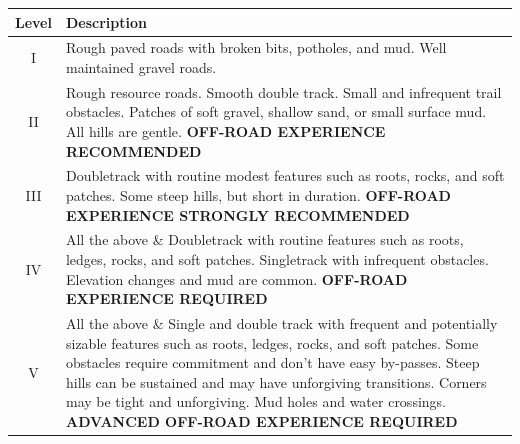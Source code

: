 \documentclass{article}
\begin{document}
\begin{minipage}[t]{0.9\linewidth}
    \begin{center}
        \begin{tabular}{|c|p{12cm}|}
            \hline
            \textbf{Level} & \textbf{Description}                                                                                                                                                                                                                                                                                                                                                                            \\
            \hline
            I              & Rough paved roads with broken bits, potholes, and mud. Well maintained gravel roads.                                                                                                                                                                                                                                                                                                            \\
            \hline
            II             & Rough resource roads. Smooth double track. Small and infrequent trail obstacles. Patches of soft gravel, shallow sand, or small surface mud. All hills are gentle. \textbf{OFF-ROAD EXPERIENCE RECOMMENDED}                                                                                                                                                                                     \\
            \hline
            III            & Doubletrack with routine modest features such as roots, rocks, and soft patches. Some steep hills, but short in duration. \textbf{OFF-ROAD EXPERIENCE STRONGLY RECOMMENDED}                                                                                                                                                                                                                     \\
            \hline
            IV             & All the above \& Doubletrack with routine features such as roots, ledges, rocks, and soft patches. Singletrack with infrequent obstacles. Elevation changes and mud are common. \textbf{OFF-ROAD EXPERIENCE REQUIRED}                                                                                                                                                                           \\
            \hline
            V              & All the above \& Single and double track with frequent and potentially sizable features such as roots, ledges, rocks, and soft patches. Some obstacles require commitment and don't have easy by-passes. Steep hills can be sustained and may have unforgiving transitions. Corners may be tight and unforgiving. Mud holes and water crossings. \textbf{ADVANCED OFF-ROAD EXPERIENCE REQUIRED} \\

\end{tabular}
\end{center}
\end{minipage}
\end{document}
